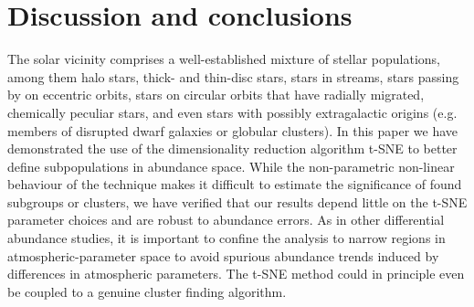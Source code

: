 \documentclass{aa}  %
\begin{document}
% 
% 
% 

\section{Discussion and conclusions}\label{conclusions}

The solar vicinity comprises a well-established mixture of stellar populations, among them halo stars, thick- and thin-disc stars, stars in streams, stars passing by on eccentric orbits, stars on circular orbits that have radially migrated, chemically peculiar stars, and even stars with possibly extragalactic origins (e.g. members of disrupted dwarf galaxies or globular clusters). 
In this paper we have demonstrated the use of the dimensionality reduction algorithm t-SNE to better define subpopulations in abundance space. While the non-parametric non-linear behaviour of the technique makes it difficult to estimate the significance of found subgroups or clusters, we have verified that our results depend little on the t-SNE parameter choices and are robust to abundance errors. As in other differential abundance studies, it is important to confine the analysis to narrow regions in atmospheric-parameter space to avoid spurious abundance trends induced by differences in atmospheric parameters. The t-SNE method could in principle even be coupled to a genuine cluster finding algorithm. 
\end{document}

